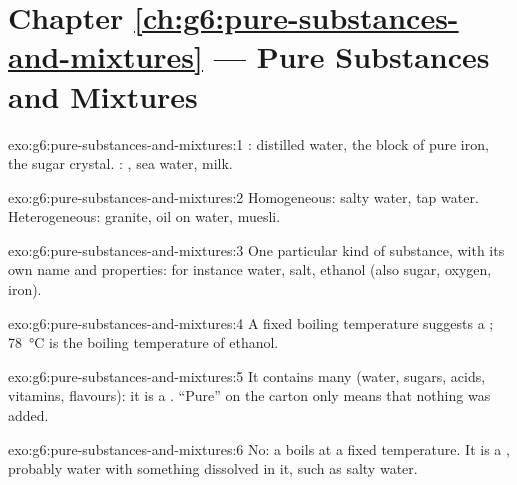 \section*{Chapter \ref{ch:g6:pure-substances-and-mixtures} --- Pure Substances and Mixtures}

\begin{solution}{exo:g6:pure-substances-and-mixtures:1}
: distilled water, the block of pure iron, the sugar
crystal. : , sea water, milk.
\end{solution}

\begin{solution}{exo:g6:pure-substances-and-mixtures:2}
Homogeneous: salty water, tap water. Heterogeneous: granite, oil on
water, muesli.
\end{solution}

\begin{solution}{exo:g6:pure-substances-and-mixtures:3}
One particular kind of substance, with its own name and properties: for
instance water, salt, ethanol (also sugar, oxygen, iron).
\end{solution}

\begin{solution}{exo:g6:pure-substances-and-mixtures:4}
A fixed boiling temperature suggests a ; \qty{78}{\celsius}
is the boiling temperature of ethanol.
\end{solution}

\begin{solution}{exo:g6:pure-substances-and-mixtures:5}
It contains many  (water, sugars, acids, vitamins,
flavours): it is a . ``Pure'' on the carton only means that
nothing was added.
\end{solution}

\begin{solution}{exo:g6:pure-substances-and-mixtures:6}
No: a  boils at a fixed temperature. It is a ,
probably water with something dissolved in it, such as salty water.
\end{solution}

